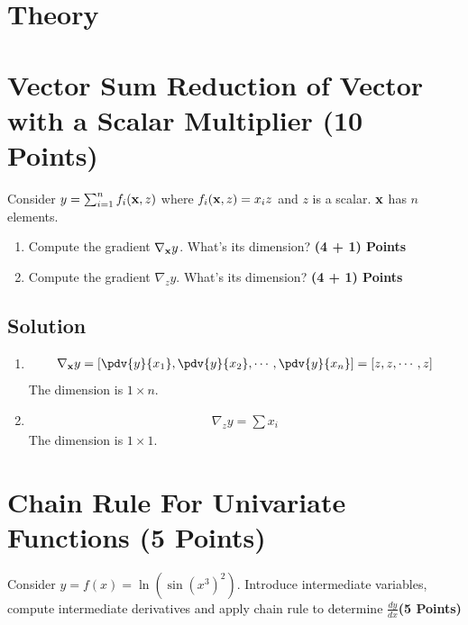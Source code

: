 \documentclass[12pt, xcolor=dvipsnames,svgnames,x11names]{article}
\begin{document}
\section*{Theory}

\section{Vector Sum Reduction of Vector with a Scalar Multiplier (10 Points)}
Consider $y = \sum_{i=1}^n f_i({\mathbf x}, z)$ where $f_i({\mathbf x}, z) = x_i z$ and $z$ is a scalar. ${\mathbf x}$ has $n$ elements.

\begin{enumerate}

\item Compute the gradient $\nabla_{\mathbf x} y$. What's its dimension?  \hfill \textbf{(4 + 1) Points}

\item Compute the gradient $\nabla_z y$. What's its dimension?  \hfill \textbf{(4 + 1) Points}
\end{enumerate}


\subsection{Solution}

\begin{enumerate}
\item
\begin{align*}
\nabla_\xbf y = [ \pdv{y}{x_1} ,  \pdv{y}{x_2}, \cdots,  \pdv{y}{x_n}] = [z, z, \cdots, z]
\end{align*}
The dimension is $1 \times n$.

\item 

\begin{align*}
\nabla_z y = \sum x_i
\end{align*}
The dimension is $1 \times 1$.



\end{enumerate}


\section{Chain Rule For Univariate Functions (5 Points)}

Consider $ y = f(x) = \ln (\sin(x^3)^2)$. Introduce intermediate variables,  compute intermediate derivatives and apply chain rule to determine $\frac{dy}{dx}$\hfill \textbf{(5 Points)}
\end{document}
